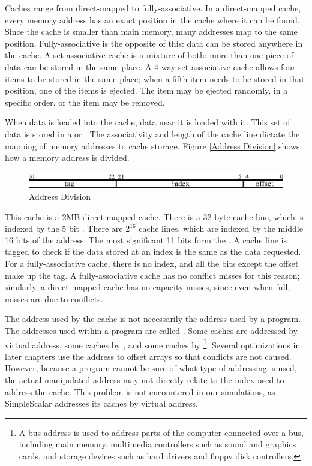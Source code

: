 Caches range from direct-mapped to fully-associative. In a direct-mapped cache,
every memory address has an exact position in the cache where it can be found.
Since the cache is smaller than main memory, many addresses map to the same position.
Fully-associative is the opposite of this: data can be stored anywhere in the
cache. A set-associative cache is a mixture of both: more than one piece of data
can be stored in the same place. A 4-way set-associative cache allows four items
to be stored in the same place; when a fifth item needs to be stored in that
position, one of the items is ejected. The item may be ejected randomly, in a
specific order, or the  item may be removed.

When data is loaded into the cache, data near it is loaded with it. This set of
data is stored in a  or . The associativity and
length of the cache line dictate the mapping of memory addresses to cache
storage. Figure \vref{Address Division} shows how a memory address is divided.

\begin{figure}[h]
\centering
\includegraphics{cache_addressing}
\caption{Address Division}
\label{Address Division}
\end{figure}

This cache is a 2MB direct-mapped cache.  There is a 32-byte cache line, which
is indexed by the 5 bit . There are $2^{16}$ cache lines, which are
indexed by the middle 16 bits of the address. The most significant 11 bits form
the . A cache line is tagged to check if the data stored at an index is
the same as the data requested. For a fully-associative cache, there is no
index, and all the bits except the offset make up the tag. A fully-associative
cache has no conflict misses for this reason; similarly, a direct-mapped cache
has no capacity misses, since even when full, misses are due to conflicts.

The address used by the cache is not necessarily the address used by a program.
The addresses used within a program 
are called . Some caches are addressed by virtual address,
some caches by , and some caches by \footnote{A bus address is used to address parts of the computer
connected over a bus, including main memory, multimedia controllers such as
sound and graphics cards, and storage devices such as hard drivers and floppy
disk controllers.}. Several optimizations in later chapters use the address to
offset arrays so that conflicts are not caused. However, because a program
cannot be sure of what type of addressing is used, the actual manipulated
address may not directly relate to the index used to address the cache. This
problem is not encountered in our simulations, as SimpleScalar
addresses its caches by virtual address.

